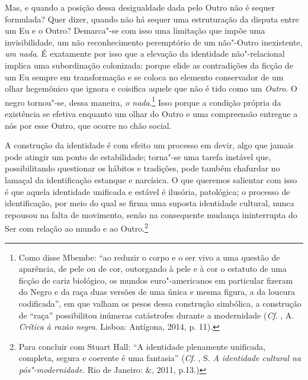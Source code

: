 Mas, e quando a posição dessa desigualdade dada pelo Outro não é sequer
formulada? Quer dizer, quando não há sequer uma estruturação da disputa
entre um Eu e o Outro? Demarca"-se com isso uma limitação que impõe uma
invisibilidade, um não reconhecimento peremptório de um não"-Outro
inexistente, \emph{um nada}. É exatamente por isso que a elevação da
identidade não"-relacional implica uma subordinação colonizada: porque
elide as contradições da ficção de um Eu sempre em transformação e se
coloca no elemento conservador de um olhar hegemônico que ignora e
coisifica aquele que não é tido como um \emph{Outro}. O negro tornou"-se,
dessa maneira, \emph{o nada}.\footnote{Como disse Mbembe: ``ao reduzir o
  corpo e o ser vivo a uma questão de aparência, de pele ou de cor,
  outorgando à pele e à cor o estatuto de uma ficção de cariz biológico,
  os mundos euro"-americanos em particular fizeram do Negro e da raça
  duas versões de uma única e mesma figura, a da loucura codificada'',
  em que valham os pesos dessa construção simbólica, a construção de
  ``raça'' possibilitou inúmeras catástrofes durante a modernidade (\emph{Cf}.
  , A. \emph{Crítica à razão negra}. Lisboa: Antígona, 2014, p. 11).}
Isso porque a condição própria da existência se efetiva enquanto um
olhar do Outro e uma compreensão entregue a nós por esse Outro, que
ocorre no chão social.

A construção da identidade é com efeito um processo em devir, algo que
jamais pode atingir um ponto de estabilidade; torna"-se uma tarefa
instável que, possibilitando questionar os hábitos e tradições, pode
também chafurdar no lamaçal da identificação estanque e narcísica. O que
queremos salientar com isso é que aquela identidade unificada e estável
é ilusória, patológica; o processo de identificação, por meio do qual se
firma uma suposta identidade cultural, nunca repousou na falta de
movimento, senão na consequente mudança ininterrupta do Ser com relação
ao mundo e ao Outro.\footnote{Para concluir com Stuart Hall: ``A
  identidade plenamente unificada, completa, segura e coerente é uma
  fantasia'' (\emph{Cf}. , S. \emph{A identidade cultural na
  pós"-modernidade}. Rio de Janeiro: \&, 2011, p.13.)}

